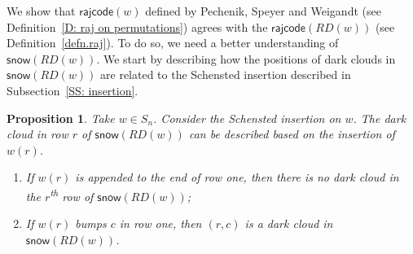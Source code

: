 \documentclass[10pt]{amsart}
\theoremstyle{plain}
\theoremstyle{plain}
\theoremstyle{definition}
\theoremstyle{definition}
\theoremstyle{definition}
\theoremstyle{plain}
\theoremstyle{plain}
\theoremstyle{plain}
\theoremstyle{plain}
\newtheorem{prop}[prop]{Proposition}
\theoremstyle{plain}
\theoremstyle{remark}
\theoremstyle{remark}
\theoremstyle{plain}
\theoremstyle{plain}
\newcommand{\snow}{\mathsf{snow}}
\newcommand{\rajcode}{\mathsf{rajcode}}
\begin{document}
We show
that $\rajcode(w)$ defined by Pechenik, Speyer and Weigandt
(see Definition~\ref{D: raj on permutations})
agrees with the $\rajcode(RD(w))$ (see Definition~\ref{defn.raj}). 
To do so, 
we need a better understanding of $\snow(RD(w))$. 
We start by describing how the positions of dark clouds in $\snow(RD(w))$ 
are related to the Schensted insertion described in Subsection~\ref{SS: insertion}.

\begin{prop}\label{prop: rsk and dark clouds}
Take $w \in S_n$.
Consider the Schensted insertion on $w$.
The dark cloud in row $r$ of $\snow(RD(w))$ can be described 
based on the insertion of $w(r)$.
\begin{enumerate}
\item If $w(r)$ is appended to the end of row one, 
then there is no dark cloud in the $r$\textsuperscript{th} row of $\snow(RD(w))$;
\item If $w(r)$ bumps $c$ in row one, 
then $(r, c)$ is a dark cloud in $\snow(RD(w))$.
\end{enumerate}
\end{prop}
\end{document}
